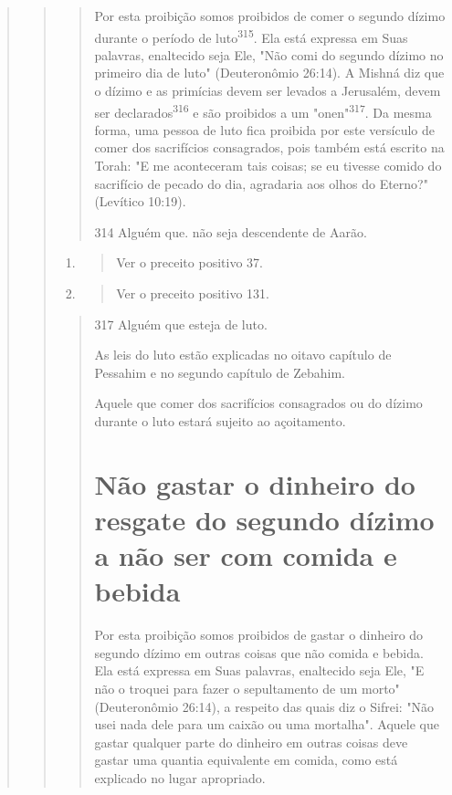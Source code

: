 \begin{quote}
\begin{quote}
\begin{quote}
Por esta proibição somos proibidos de comer o segundo dízimo du­rante o
período de luto\textsuperscript{315}. Ela está expressa em Suas
palavras, enaltecido seja Ele, "Não comi do segundo dízimo no primeiro
dia de luto" (Deuteronômio 26:14). A Mishná diz que o dízimo e as
primícias devem ser levados a Jerusa­lém, devem ser
declarados\textsuperscript{316} e são proibidos a um
"onen"\textsuperscript{317}. Da mesma for­ma, uma pessoa de luto fica
proibida por este versículo de comer dos sacrifí­cios consagrados, pois
também está escrito na Torah: "E me aconteceram tais coisas; se eu
tivesse comido do sacrifício de pecado do dia, agradaria aos olhos do
Eterno?" (Levítico 10:19).

314 Alguém que. não seja descendente de Aarão.
\end{quote}

\begin{enumerate}
\def\labelenumi{\arabic{enumi}.}
\setcounter{enumi}{314}
\item
 \begin{quote}
 Ver o preceito positivo 37.
 \end{quote}
\item
 \begin{quote}
 Ver o preceito positivo 131.
 \end{quote}
\end{enumerate}

\begin{quote}
317 Alguém que esteja de luto.

As leis do luto estão explicadas no oitavo capítulo de Pessahim e no
segundo capítulo de Zebahim.

Aquele que comer dos sacrifícios consagrados ou do dízimo duran­te o
luto estará sujeito ao açoitamento.

\section{Não gastar o dinheiro do resgate do segundo dízimo a não ser com comida e bebida}

Por esta proibição somos proibidos de gastar o dinheiro do segun­do
dízimo em outras coisas que não comida e bebida. Ela está expressa em
Suas palavras, enaltecido seja Ele, "E não o troquei para fazer o
sepultamento de um morto" (Deuteronômio 26:14), a respeito das quais diz
o Sifrei: "Não usei nada dele para um caixão ou uma mortalha". Aquele
que gastar qualquer parte do dinheiro em outras coisas deve gastar uma
quantia equivalente em comida, co­mo está explicado no lugar apropriado.


\end{quote}
\end{quote}
\end{quote}
